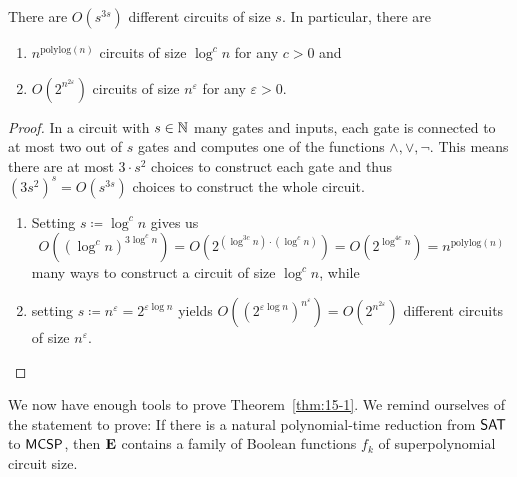 \documentclass[11pt]{article}
\begin{document}
\begin{lemma}
  \label{lem:num-of-circs}
  There are $O(s^{3s})$ different circuits of size $s$.
  In particular, there are
  \begin{enumerate}
    \item $n^{\mathrm{polylog}(n)}$ circuits of size $\log^c n$ for any
      $c > 0$ and

    \item $O(2^{n^{2 \varepsilon}})$ circuits of size
      $n^\varepsilon$ for any $\varepsilon > 0$.
  \end{enumerate}
\end{lemma}

\begin{proof}
  In a circuit with $s \in {\mathbb{N}}$ many gates and inputs, each gate is connected to
  at most two out of $s$ gates and computes one of the functions
  $\land, \lor, \neg$.
  This means there are at most $3 \cdot s^2$ choices to construct each gate
  and thus $(3 s^2)^s = O(s^{3s})$ choices to construct the whole circuit.

  \begin{enumerate}
    \item Setting $s \coloneqq \log^c n$ gives us
      \[
        O((\log^c n)^{3 \log^c n})
        =
        O(2^{(\log^{3c} n) \cdot (\log^c n)})
        =
        O(2^{\log^{4c} n})
        =
        n^{\mathrm{polylog}(n)}
      \]
      many ways to construct a circuit of size $\log^c n$, while

    \item setting $s \coloneqq n^\varepsilon = 2^{\varepsilon \log n}$ yields
      $
        O((2^{\varepsilon \log n})^{n^\varepsilon})
        =
        O(2^{n^{2 \varepsilon}})
      $
      different circuits of size $n^\varepsilon$.
  \end{enumerate}
\end{proof}

We now have enough tools to prove Theorem~\ref{thm:15-1}.
We remind ourselves of the statement to prove:
If there is a natural polynomial-time reduction from
$\mathsf{SAT}$ to $\mathsf{MCSP}$, then $\mathbf{E}$
contains a family of Boolean functions $f_k$ of superpolynomial circuit
size.
\end{document}
